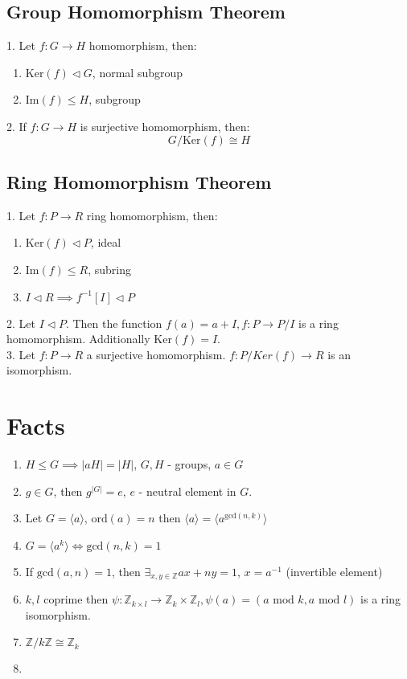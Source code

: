 \documentclass{article}
\begin{document}
\subsection{Group Homomorphism Theorem}

1. Let \(f: G \rightarrow H \) homomorphism, then:
\begin{enumerate}
    \item \(\text{Ker}(f) \lhd G \), normal subgroup
    \item \(\text{Im}(f) \leq H \), subgroup
\end{enumerate}
2. If \(f: G \rightarrow H \) is surjective homomorphism, then:
\[
G/\text{Ker}(f) \cong H
\]

\subsection{Ring Homomorphism Theorem}

1. Let \(f: P \rightarrow R \) ring homomorphism, then:
\begin{enumerate}
    \item \(\text{Ker}(f) \lhd P \), ideal
    \item \(\text{Im}(f) \leq R \), subring
    \item \(I \lhd R \implies f^{-1}[I] \lhd P\)
\end{enumerate}
2. Let \(I \lhd P\). Then the function \(f(a) = a + I, f: P\to P/I\) is a ring homomorphism.
Additionally \(\text{Ker}(f) = I\).\\
3. Let \(f: P\to R\) a surjective homomorphism. \(f: P/Ker(f) \to R\) is an isomorphism.



\section{Facts}

\begin{enumerate}
    \item \(H \leq G \implies |aH| = |H|\), $G,H$ - groups, $a\in G$
    \item \(g\in G\), then \(g^{|G|} = e\), $e$ - neutral element in $G$.
    \item Let \(G = \langle a \rangle\), \(\text{ord}(a)=n\) 
    then \(\langle a \rangle = \langle a^{\text{gcd}(n,k)} \rangle\)
    \item \(G = \langle a^k \rangle \iff \text{gcd}(n,k) = 1\)
    \item If \(\text{gcd}(a,n) = 1\), then \( \exists_{x,y\in \mathbb{Z}} ax+ny=1 \), \(x=a^{-1}\) (invertible element)
    \item \(k,l\) coprime then \(\psi : \mathbb{Z}_{k\times l} \to \mathbb{Z}_{k} \times \mathbb{Z}_{l}, \psi(a) = (a \text{ mod } k, a \text{ mod } l)\) is a ring isomorphism.
    \item \(\mathbb{Z}/k\mathbb{Z} \cong \mathbb{Z}_k\)
    \item 
\end{enumerate}
\end{document}
